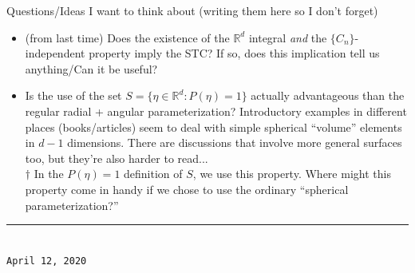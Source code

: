 \documentclass{article}
\theoremstyle{definition}
\begin{document}
\noindent Questions/Ideas I want to think about (writing them here so I don't forget)
\begin{itemize}
    \item (from last time) Does the existence of the $\mathbb{R}^d$ integral \textit{and} the $\{ C_n \}$-independent property imply the STC? If so, does this implication tell us anything/Can it be useful?
    
    \item Is the use of the set $S = \{ \eta \in \mathbb{R}^d : P(\eta) = 1\} $ actually advantageous than the regular radial + angular parameterization? Introductory examples in different places (books/articles) seem to deal with simple spherical ``volume'' elements in $d-1$ dimensions. There are discussions that involve more general surfaces too, but they're also harder to read...  \\
    
    $\dagger$ In the $P(\eta) = 1$ definition of $S$, we use this property. Where might this property come in handy if we chose to use the ordinary ``spherical parameterization?''
    
\end{itemize}



\hrule
$\,$\\

\noindent \texttt{April 12, 2020}\\
\end{document}
